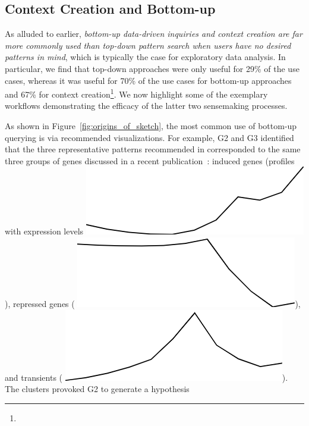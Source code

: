 \subsection{Context Creation and Bottom-up }%
\par As alluded to earlier,
\emph{bottom-up data-driven inquiries
and context creation are far more commonly
used than top-down pattern search
when users have no desired patterns in mind},
which is typically the case for exploratory data analysis.
In particular, we find that top-down approaches
were only useful for 29\% of the use cases,
whereas it was useful for 70\% of the use cases
for bottom-up approaches and 67\%
for context creation\footnote{}. We now highlight some of the exemplary workflows demonstrating the efficacy of the latter two sensemaking processes.
\par As shown in Figure~\ref{fig:origins_of_sketch},
the most common use of bottom-up querying
is via recommended visualizations. For example, G2 and G3 identified that
the three representative patterns
recommended in \zvpp corresponded
to the same three groups of genes discussed
in a recent publication~\cite{Gloss2017}:
induced genes (profiles with expression levels  \includegraphics[width=2\baselineskip,keepaspectratio]{figures/induced.png}),
repressed genes ( \includegraphics[width=2\baselineskip,keepaspectratio]{figures/repressed.png}),
and transients ( \includegraphics[width=2\baselineskip,keepaspectratio]{figures/transient.png}). The clusters provoked G2 to generate a hypothesis
